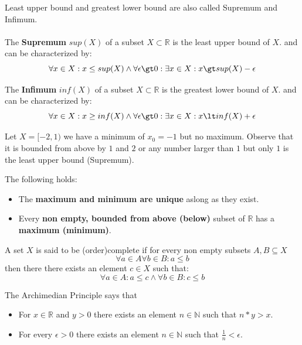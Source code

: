 \begin{definition}
Least upper bound and greatest lower bound are also called Supremum and Infimum.
\\ \\
The \textbf{Supremum} $sup(X)$ of a subset $X \subset \mathbb{R}$ is the least upper bound of $X$. and can be characterized by:
$$\forall x \in X: x \leq sup(X) \land \\ \forall \epsilon \gt 0: \exists x \in X: x \gt sup(X) - \epsilon$$

The \textbf{Infimum} $inf(X)$ of a subset $X \subset \mathbb{R}$ is the greatest lower bound of $X$. and can be characterized by:
$$\forall x \in X: x \geq inf(X) \land \\ \forall \epsilon \gt 0: \exists x \in X: x \lt inf(X) + \epsilon$$
\end{definition}

\begin{example}
Let $X = [-2, 1)$ we have a minimum of $x_0 = -1$ but no maximum. Observe that it is bounded from above by $1$ and $2$ or any number larger than $1$ but only $1$ is the least upper bound (Supremum).
\end{example}

\begin{theorem}
The following holds:
\begin{itemize}
    \item The \textbf{maximum and minimum are unique} aslong as they exist.
    \item Every \textbf{non empty, bounded from above (below)} subset of $\mathbb{R}$ has a \textbf{maximum (minimum)}.
\end{itemize}
\end{theorem}

\begin{definition}
A set $X$ is said to be (order)complete if for every non empty subsets $A, B \subseteq X$
$$\forall a \in A \forall b \in B: a \leq b$$
then there there exists an element $c \in X$ such that:
$$\forall a \in A: a \leq c \land \forall b \in B: c \leq b$$
\end{definition}

\begin{theorem}
The Archimedian Principle says that
\begin{itemize}
    \item For $x \in \mathbb{R}$ and $y \gt 0$ there exists an element $n \in \mathbb{N}$ such that $n * y \gt x$.
    \item For every $\epsilon \gt 0$ there exists an element $n \in \mathbb{N}$ such that $\frac{1}{n} \lt \epsilon$.
\end{itemize}
\end{theorem}

